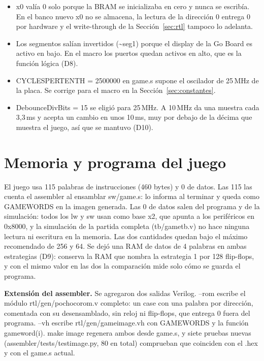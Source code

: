 \documentclass[11pt,a4paper]{article}
\DeclareRobustCommand{\sig}[1]{{\ttfamily\def\_{\textunderscore\allowbreak}#1}}
\begin{document}
\begin{itemize}[nosep,leftmargin=1.2em]
\item \sig{x0} valía 0 solo porque la BRAM se inicializaba en cero y nunca se escribía. En el banco nuevo \sig{x0} no se almacena, la lectura de la dirección 0 entrega 0 por hardware y el write-through de la Sección~\ref{sec:rtl} tampoco lo adelanta.
\item Los segmentos salían invertidos (\sig{\textasciitilde seg1}) porque el display de la Go Board es activo en bajo. En el macro los puertos quedan activos en alto, que es la función lógica (D8).
\item \sig{CYCLES\_PER\_TENTH = 2500000} en \sig{game.s} supone el oscilador de 25\,MHz de la placa. Se corrige para el macro en la Sección~\ref{sec:constantes}.
\item \sig{DebounceDivBits = 15} se eligió para 25\,MHz. A 10\,MHz da una muestra cada 3,3\,ms y acepta un cambio en unos 10\,ms, muy por debajo de la décima que muestra el juego, así que se mantuvo (D10).
\end{itemize}

\section{Memoria y programa del juego}
\label{sec:mem}

El juego usa 115 palabras de instrucciones (460 bytes) y 0 de datos. Las 115 las cuenta el assembler al ensamblar \sig{sw/game.s}: lo informa al terminar y queda como \sig{GAME\_WORDS} en la imagen generada. Las 0 de datos salen del programa y de la simulación: todos los \sig{lw} y \sig{sw} usan como base \sig{x2}, que apunta a los periféricos en \sig{0x8000\_0000}, y la simulación de la partida completa (\sig{tb/game\_tb.v}) no hace ninguna lectura ni escritura en la memoria. Las dos cantidades quedan bajo el máximo recomendado de 256 y 64. Se dejó una RAM de datos de 4 palabras en ambas estrategias (D9): conserva la RAM que nombra la estrategia 1 por 128 flip-flops, y con el mismo valor en las dos la comparación mide solo cómo se guarda el programa.

\textbf{Extensión del assembler.} Se agregaron dos salidas Verilog. \sig{--rom} escribe el módulo \sig{rtl/gen/pochoco\_rom.v} completo: un \sig{case} con una palabra por dirección, comentada con su desensamblado, sin reloj ni flip-flops, que entrega 0 fuera del programa. \sig{--vh} escribe \sig{rtl/gen/game\_image.vh} con \sig{GAME\_WORDS} y la función \sig{game\_word(i)}. \sig{make image} regenera ambos desde \sig{game.s}, y siete pruebas nuevas (\sig{assembler/tests/test\_image.py}, 80 en total) comprueban que coinciden con el \sig{.hex} y con el \sig{game.s} actual.
\end{document}
